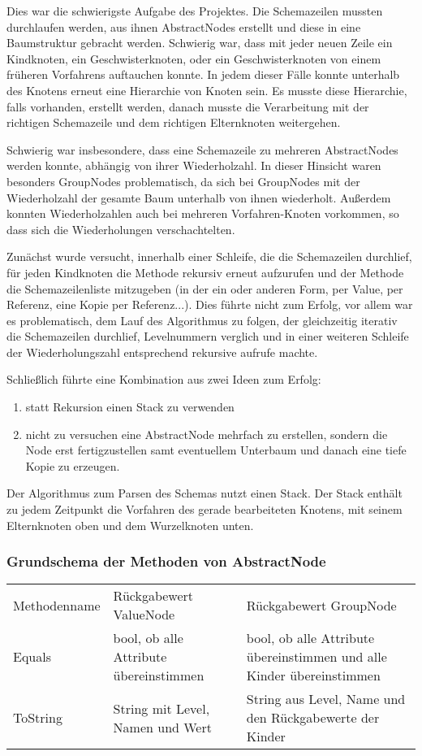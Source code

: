 Dies war die schwierigste Aufgabe des Projektes. Die Schemazeilen mussten durchlaufen werden, aus ihnen AbstractNodes erstellt und diese in eine Baumstruktur gebracht werden.
Schwierig war, dass mit jeder neuen Zeile ein Kindknoten, ein Geschwisterknoten, oder ein Geschwisterknoten von einem früheren Vorfahrens auftauchen konnte. In jedem dieser Fälle konnte unterhalb des Knotens erneut eine Hierarchie von Knoten sein. Es musste diese Hierarchie, falls vorhanden, erstellt werden, danach musste die Verarbeitung mit der richtigen Schemazeile und dem richtigen Elternknoten weitergehen.

Schwierig war insbesondere, dass eine Schemazeile zu mehreren AbstractNodes werden konnte, abhängig von ihrer Wiederholzahl. In dieser Hinsicht waren besonders GroupNodes problematisch, da sich bei GroupNodes mit der Wiederholzahl der gesamte Baum unterhalb von ihnen wiederholt. Außerdem konnten Wiederholzahlen auch bei mehreren Vorfahren-Knoten vorkommen, so dass sich die Wiederholungen verschachtelten.

Zunächst wurde versucht, innerhalb einer Schleife, die die Schemazeilen durchlief, für jeden Kindknoten die Methode rekursiv erneut aufzurufen und der Methode die Schemazeilenliste mitzugeben (in der ein oder anderen Form, per Value, per Referenz, eine Kopie per Referenz...). Dies führte nicht zum Erfolg, vor allem war es problematisch, dem Lauf des Algorithmus zu folgen, der gleichzeitig iterativ die Schemazeilen durchlief, Levelnummern verglich und in einer weiteren Schleife der Wiederholungszahl entsprechend rekursive aufrufe machte.

Schließlich führte eine Kombination aus zwei Ideen zum Erfolg:
\begin{enumerate}
\item statt Rekursion einen Stack zu verwenden
\item nicht zu versuchen eine AbstractNode mehrfach zu erstellen, sondern die Node erst fertigzustellen samt eventuellem Unterbaum und danach eine tiefe Kopie zu erzeugen. 
\end{enumerate}

Der Algorithmus zum Parsen des Schemas nutzt einen Stack. Der Stack enthält zu jedem Zeitpunkt die Vorfahren des gerade bearbeiteten Knotens, mit seinem Elternknoten oben und dem Wurzelknoten unten.



\subsubsection{Grundschema der Methoden von AbstractNode}
\label{sec:RekursiveMethoden}
\begin{tabularx}{0px}{l|l|l}
Methodenname & Rückgabewert ValueNode & Rückgabewert GroupNode\\
Equals & bool, ob alle Attribute übereinstimmen & bool, ob alle Attribute übereinstimmen und alle Kinder übereinstimmen\\%
ToString & String mit Level, Namen und Wert & String aus Level, Name und den Rückgabewerte der Kinder\\
\end{tabularx}




